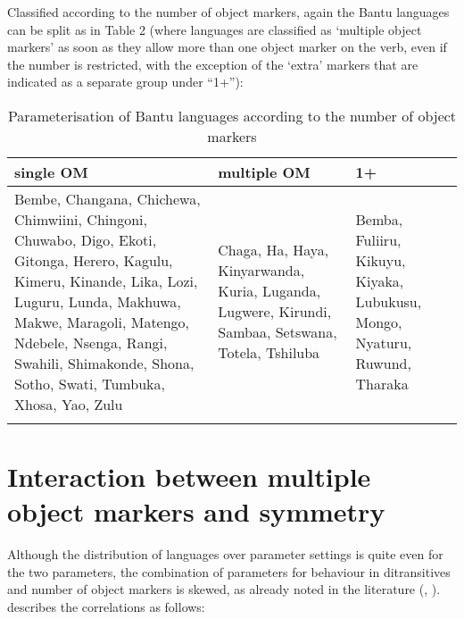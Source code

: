 \documentclass[output=paper
,modfonts
,nonflat]{langsci/langscibook}
\begin{document}
Classified according to the number of object markers, again the Bantu languages can be split as in Table 2 (where languages are classified as ‘multiple object markers’ as soon as they allow more than one object marker on the verb, even if the number is restricted, with the exception of the ‘extra’ markers that are indicated as a separate group under “1+”):
\begin{table}
\caption{Parameterisation of Bantu languages according to the number of object markers}	
\label{Table 2}
\begin{tabularx}{\textwidth}{XXX}
	\lsptoprule
	single OM & multiple OM & 1+ \\ 
	\midrule
	Bembe, Changana, Chichewa, Chimwiini, Chingoni, Chuwabo, Digo, Ekoti, Gitonga, Herero, Kagulu, Kimeru, Kinande, Lika, Lozi, Luguru, Lunda, Makhuwa, Makwe, Maragoli, Matengo, Ndebele, Nsenga, Rangi, Swahili, Shimakonde, Shona, Sotho, Swati, Tumbuka, Xhosa, Yao, Zulu & Chaga, Ha, Haya, Kinyarwanda, Kuria, Luganda, Lugwere, Kirundi, Sambaa, Setswana, Totela, Tshiluba & Bemba, Fuliiru, Kikuyu, Kiyaka, Lubukusu, Mongo, Nyaturu, Ruwund, Tharaka\\
	\lspbottomrule
\end{tabularx}
\end{table}

\section{Interaction between multiple object markers and symmetry}

Although the distribution of languages over parameter settings is quite even for the two parameters, the combination of parameters for behaviour in ditransitives and number of object markers is skewed, as already noted in the literature (\citealt[185]{Henderson2006}, \citealt[227]{Zeller_Ngoboka2015}). \citet{Riedel2009} describes the correlations as follows:
\end{document}
